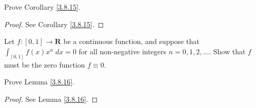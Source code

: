 \begin{exercise}\label{ex 3.8.7}
    Prove Corollary \ref{3.8.15}.
\end{exercise}

\begin{proof}
    See Corollary \ref{3.8.15}.
\end{proof}

\begin{exercise}\label{ex 3.8.8}
    Let \(f : [0, 1] \to \mathbf{R}\) be a continuous function, and suppose that \(\int_{[0, 1]} f(x) x^n \; dx = 0\) for all non-negative integers \(n = 0, 1, 2, \dots\).
    Show that \(f\) must be the zero function \(f \equiv 0\).
\end{exercise}

\begin{exercise}\label{ex 3.8.9}
    Prove Lemma \ref{3.8.16}.
\end{exercise}

\begin{proof}
    See Lemma \ref{3.8.16}.
\end{proof}